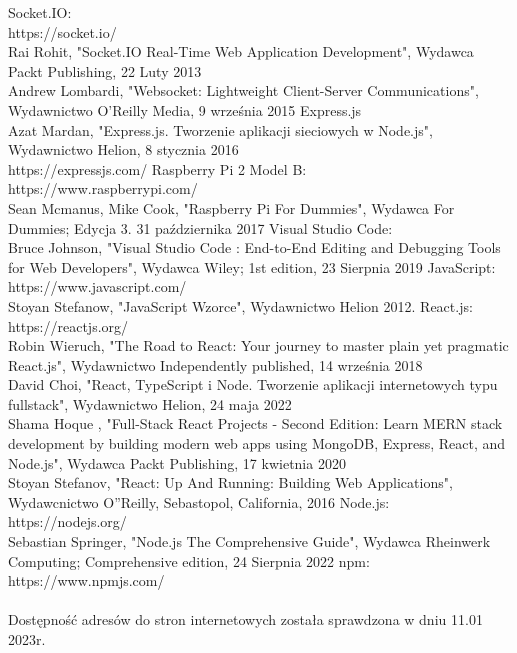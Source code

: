 \begin{thebibliography}{1}
 Socket.IO:
\\
https://socket.io/
\\
Rai Rohit, "Socket.IO Real-Time Web Application Development", Wydawca Packt Publishing, 22 Luty 2013
\\
Andrew Lombardi, "Websocket: Lightweight Client-Server Communications", Wydawnictwo O'Reilly Media, 9 września 2015
 Express.js
\\
Azat Mardan, "Express.js. Tworzenie aplikacji sieciowych w Node.js", Wydawnictwo Helion, 8 stycznia 2016
\\
https://expressjs.com/
Raspberry Pi 2 Model B:
\\
https://www.raspberrypi.com/
\\
 Sean Mcmanus, Mike Cook, "Raspberry Pi For Dummies", Wydawca  For Dummies; Edycja 3. 31 października 2017
Visual Studio Code:
\\
Bruce Johnson, "Visual Studio Code : End-to-End Editing and Debugging Tools for Web Developers", Wydawca Wiley; 1st edition, 23 Sierpnia 2019
 JavaScript:
\\
https://www.javascript.com/
\\
Stoyan Stefanow, "JavaScript Wzorce", Wydawnictwo Helion 2012.
React.js:
\\
https://reactjs.org/
\\
Robin Wieruch, "The Road to React: Your journey to master plain yet pragmatic React.js", Wydawnictwo Independently published, 14 września 2018
\\
David Choi, "React, TypeScript i Node. Tworzenie aplikacji internetowych typu fullstack",  Wydawnictwo Helion, 24 maja 2022
\\
Shama Hoque , "Full-Stack React Projects - Second Edition: Learn MERN stack development by building modern web apps using MongoDB, Express, React, and Node.js", Wydawca Packt Publishing, 17 kwietnia 2020
\\
Stoyan Stefanov, "React: Up And Running: Building Web Applications", Wydawcnictwo O''Reilly, Sebastopol, California, 2016
Node.js:
\\
https://nodejs.org/
\\
Sebastian Springer, "Node.js The Comprehensive Guide", Wydawca Rheinwerk Computing; Comprehensive edition, 24 Sierpnia 2022
 npm:
\\
https://www.npmjs.com/
\\
\\
Dostępność adresów do stron internetowych została sprawdzona w dniu 11.01 2023r.

\end{thebibliography}

\listoftables

\listoffigures

\lstlistoflistings




